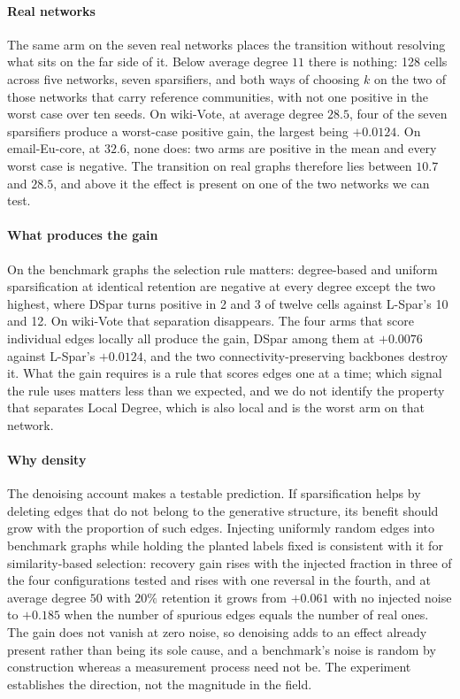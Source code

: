 \paragraph{Real networks}
The same arm on the seven real networks places the transition without resolving
what sits on the far side of it. Below average degree $11$ there is nothing: 128
cells across five networks, seven sparsifiers, and both ways of choosing $k$ on
the two of those networks that carry reference communities, with not
one positive in the worst case over ten seeds. On wiki-Vote, at average degree
$28.5$, four of the seven sparsifiers produce a worst-case positive gain, the
largest being $+0.0124$. On email-Eu-core, at $32.6$, none does: two arms are
positive in the mean and every worst case is negative. The transition on real
graphs therefore lies between $10.7$ and $28.5$, and above it the effect is
present on one of the two networks we can test.

\paragraph{What produces the gain}
On the benchmark graphs the selection rule matters: degree-based and uniform
sparsification at identical retention are negative at every degree except the two
highest, where DSpar turns positive in 2 and 3 of twelve cells against L-Spar's
10 and 12. On wiki-Vote that separation disappears. The four arms that score
individual edges locally all produce the gain, DSpar among them at $+0.0076$
against L-Spar's $+0.0124$, and the two connectivity-preserving backbones destroy
it. What the gain requires is a rule that scores edges one at a time; which
signal the rule uses matters less than we expected, and we do not identify the
property that separates Local Degree, which is also local and is the worst arm on
that network.

\paragraph{Why density}
The denoising account makes a testable prediction. If sparsification helps by
deleting edges that do not belong to the generative structure, its benefit should
grow with the proportion of such edges. Injecting uniformly random edges into
benchmark graphs while holding the planted labels fixed is consistent with it for
similarity-based selection: recovery gain rises with the injected
fraction in three of the four configurations tested and rises with one reversal
in the fourth, and at average degree
$50$ with $20\%$ retention it grows from $+0.061$ with no injected noise to
$+0.185$ when the number of spurious edges equals the number of real ones. The
gain does not vanish at zero noise, so denoising adds to an effect already
present rather than being its sole cause, and a benchmark's noise is random by
construction whereas a measurement process need not be. The experiment
establishes the direction, not the magnitude in the field.

